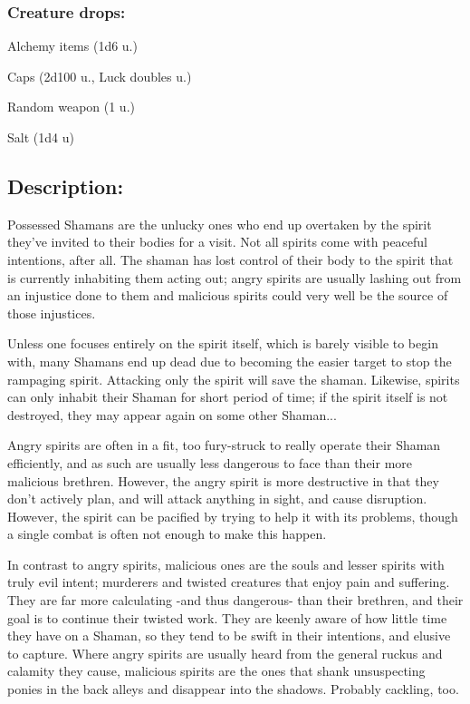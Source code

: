 \documentclass[11pt,a4paper,twocolumn]{book}
\begin{document}
	\subsubsection*{Creature drops:}
	\begin{compactitem}
		\item Alchemy items (1d6 u.)
		\item Caps (2d100 u., Luck doubles u.)
		\item Random weapon (1 u.)
		\item Salt (1d4 u)
	\end{compactitem}

	\subsection*{Description:}
	Possessed Shamans are the unlucky ones who end up overtaken by the spirit they've invited to their bodies for a visit. Not all spirits come with peaceful intentions, after all. The shaman has lost control of their body to the spirit that is currently inhabiting them acting out; angry spirits are usually lashing out from an injustice done to them and malicious spirits could very well be the source of those injustices.
	
	Unless one focuses entirely on the spirit itself, which is barely visible to begin with, many Shamans end up dead due to becoming the easier target to stop the rampaging spirit. Attacking only the spirit will save the shaman. Likewise, spirits can only inhabit their Shaman for short period of time; if the spirit itself is not destroyed, they may appear again on some other Shaman...
	
	\medskip
	
	Angry spirits are often in a fit, too fury-struck to really operate their Shaman efficiently, and as such are usually less dangerous to face than their more malicious brethren. However, the angry spirit is more destructive in that they don't actively plan, and will attack anything in sight, and cause disruption. 
	However, the spirit can be pacified by trying to help it with its problems, though a single combat is often not enough to make this happen. 
	
	\medskip
	
	In contrast to angry spirits, malicious ones are the souls and lesser spirits with truly evil intent; murderers and twisted creatures that enjoy pain and suffering. They are far more calculating -and thus dangerous- than their brethren, and their goal is to continue their twisted work. They are keenly aware of how little time they have on a Shaman, so they tend to be swift in their intentions, and elusive to capture. Where angry spirits are usually heard from the general ruckus and calamity they cause, malicious spirits are the ones that shank unsuspecting ponies in the back alleys and disappear into the shadows. Probably cackling, too.
\end{document}
